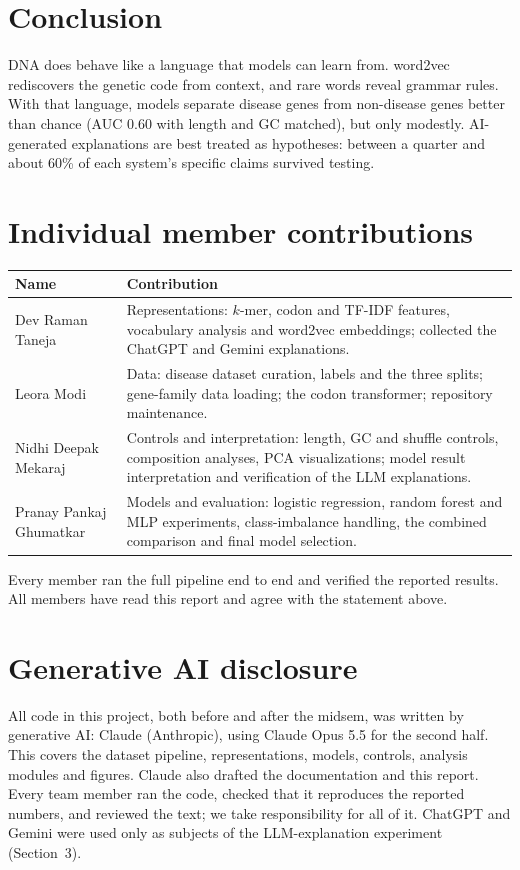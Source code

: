 \documentclass[11pt,a4paper,twocolumn]{article}
\begin{document}
\section{Conclusion}
DNA does behave like a language that models can learn from. word2vec rediscovers
the genetic code from context, and rare words reveal grammar rules. With that
language, models separate disease genes from non-disease genes better than
chance (AUC 0.60 with length and GC matched), but only modestly. AI-generated
explanations are best treated as hypotheses: between a quarter and about 60\% of
each system's specific claims survived testing.

\section*{Individual member contributions}
{\small
\begin{tabularx}{\linewidth}{@{}>{\raggedright}p{2.1cm} >{\raggedright\arraybackslash}X@{}}
\toprule
Name & Contribution \\
\midrule
Dev Raman Taneja & Representations: $k$-mer, codon and TF-IDF features,
vocabulary analysis and word2vec embeddings; collected the ChatGPT and Gemini
explanations. \\
Leora Modi & Data: disease dataset curation, labels and the three splits;
gene-family data loading; the codon transformer; repository maintenance. \\
Nidhi Deepak Mekaraj & Controls and interpretation: length, GC and shuffle
controls, composition analyses, PCA visualizations; model result interpretation
and verification of the LLM explanations. \\
Pranay Pankaj Ghumatkar & Models and evaluation: logistic regression, random
forest and MLP experiments, class-imbalance handling, the combined comparison
and final model selection. \\
\bottomrule
\end{tabularx}}

\smallskip
\noindent Every member ran the full pipeline end to end and verified the
reported results. All members have read this report and agree with the
statement above.

\section*{Generative AI disclosure}
All code in this project, both before and after the midsem, was written by
generative AI: Claude (Anthropic), using Claude Opus 5.5 for the second half.
This covers the dataset pipeline, representations, models, controls,
analysis modules and figures. Claude also drafted the documentation and this
report. Every team member ran the code, checked that it reproduces the
reported numbers, and reviewed the text; we take responsibility for all of
it. ChatGPT and Gemini were used only as subjects of the LLM-explanation
experiment (Section~3).
\end{document}
